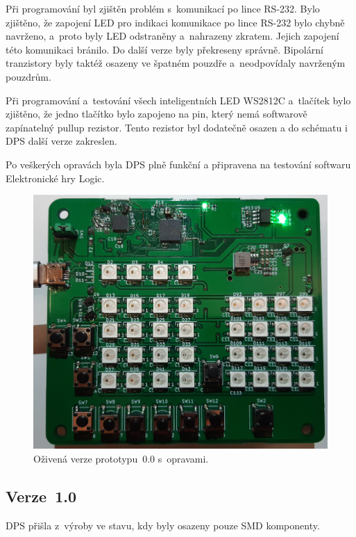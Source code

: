   Při programování byl zjištěn problém s~komunikací po lince RS-232. Bylo zjištěno, že zapojení LED pro indikaci komunikace po lince RS-232 bylo 
  chybně navrženo, a~proto byly LED odstraněny a~nahrazeny zkratem. Jejich zapojení této komunikaci bránilo. Do další verze byly překreseny správně.
  Bipolární tranzistory byly taktéž osazeny ve špatném pouzdře a~neodpovídaly navrženým pouzdrům. 
  
  Při programování a~testování všech inteligentních LED WS2812C a~tlačítek bylo zjištěno, že jedno tlačítko bylo zapojeno na pin, který 
  nemá softwarově zapínatelný pullup rezistor. Tento rezistor byl dodatečně osazen a do schématu i DPS další verze zakreslen. 
  
  Po veškerých opravách byla DPS plně funkční a připravena na testování softwaru Elektronické hry Logic.

  \begin{figure}[!h]
    \begin{center}
      \includegraphics[scale=0.1]{obrazky/Verze0_zapnuto_nabito.jpg}
    \end{center}
    \caption[Oživená verze prototypu~0.0 s~opravami]{Oživená verze prototypu~0.0 s~opravami.}
  \end{figure}

  \newpage
  \subsection{Verze~1.0}
  DPS přišla z~výroby ve stavu, kdy byly osazeny pouze SMD komponenty. 

